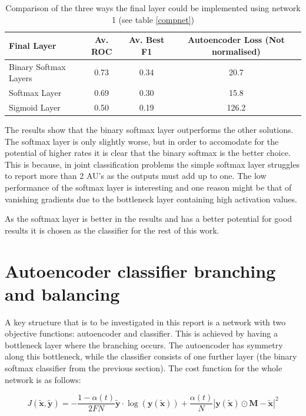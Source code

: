 \begin{table}[!h] {\small
  \centering
  \begin{tabular}{lccc}
  \hline
  Final Layer   & Av. ROC &   Av. Best F1 &   Autoencoder Loss (Not normalised) \\
  \hline
  Binary Softmax Layers  &   0.73 &  0.34 &   20.7 \\
  Softmax Layer          &   0.69 &  0.30 &   15.8 \\
  Sigmoid Layer          &   0.50 &  0.19 &  126.2 \\
  \hline
  \end{tabular}
\caption{Comparison of the three ways the final layer could be implemented using network 1 (see table \ref{compnet})} \label{net:classcompnet} }
\end{table}

The results show that the binary softmax layer outperforms the other solutions. The
softmax layer is only slightly worse, but in order to accomodate for the potential of higher rates
it is clear that the binary softmax is the better choice. This is because, in joint classification problems
the simple softmax layer struggles to report more than 2 AU's as the outputs must add up to one.
The low performance of the softmax layer is interesting and one reason might be that of vanishing gradients due to
the bottleneck layer containing high activation values.

As the softmax layer is better in the results and has a better potential for good results
it is chosen as the classifier for the rest of this work.

\section{Autoencoder classifier branching and balancing} \label{sec:autoalpha}
A key structure that is to be investigated in this report is a network with two objective functions:
autoencoder and classifier. This is achieved by having a bottleneck layer where the branching occurs.
The autoencoder has symmetry along this bottleneck, while the classifier consists of one further layer
(the binary softmax classifier from the previous section). The cost function for the whole network is as follows:

\begin{equation}
    J(\tilde{\mathbf{x}},\tilde{\mathbf{y}}) = -\frac{1-\alpha(t)}{2FN}\tilde{\mathbf{y}}\cdot\log(\mathbf{y}(\tilde{\mathbf{x}}))
    + \frac{\alpha(t)}{N}\left |\mathbf{y}(\tilde{\mathbf{x}}) \odot \mathbf{M}-\tilde{\mathbf{x}}\right | ^2
\end{equation}

